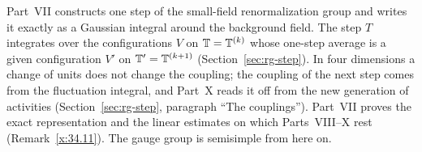 \label{intro:VII}
Part~VII constructs one step of the small-field renormalization group and writes it exactly as a Gaussian integral around the background field. The step $T$ integrates over the configurations $V$ on $\mathbb T=\mathbb T^{(k)}$ whose one-step average is a given configuration $V'$ on $\mathbb T'=\mathbb T^{(k+1)}$ (Section~\ref{sec:rg-step}). In four dimensions a change of units does not change the coupling; the coupling of the next step comes from the fluctuation integral, and Part~X reads it off from the new generation of activities (Section~\ref{sec:rg-step}, paragraph ``The couplings''). Part~VII proves the exact representation and the linear estimates on which Parts~VIII--X rest (Remark~\ref{x:34.11}). The gauge group is semisimple from here on.

